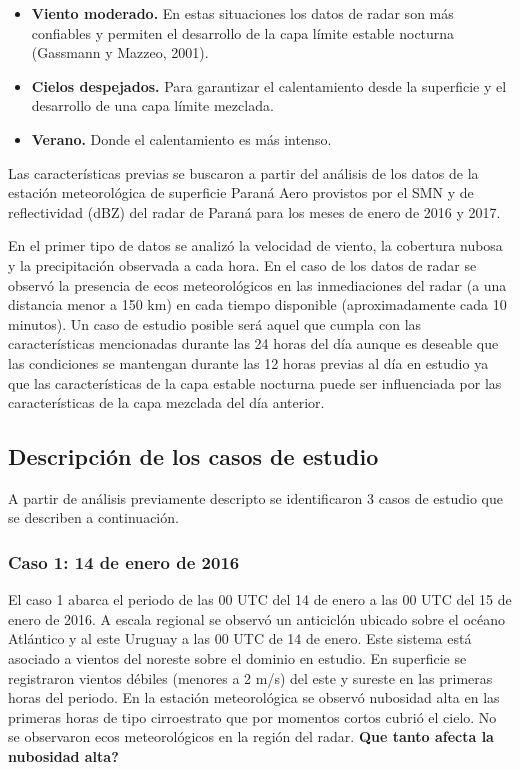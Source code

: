 \documentclass[12pt,spanish,oneside]{book}
\providecommand{\tightlist}{%
  \setlength{\itemsep}{0pt}\setlength{\parskip}{0pt}}
\begin{document}
\begin{itemize}
\tightlist
\item
  \textbf{Viento moderado.} En estas situaciones los datos de radar son
  más confiables y permiten el desarrollo de la capa límite estable
  nocturna (Gassmann y Mazzeo, 2001).
\item
  \textbf{Cielos despejados.} Para garantizar el calentamiento desde la
  superficie y el desarrollo de una capa límite mezclada.
\item
  \textbf{Verano.} Donde el calentamiento es más intenso.
\end{itemize}

Las características previas se buscaron a partir del análisis de los
datos de la estación meteorológica de superficie Paraná Aero provistos
por el SMN y de reflectividad (dBZ) del radar de Paraná para los meses
de enero de 2016 y 2017.

En el primer tipo de datos se analizó la velocidad de viento, la
cobertura nubosa y la precipitación observada a cada hora. En el caso de
los datos de radar se observó la presencia de ecos meteorológicos en las
inmediaciones del radar (a una distancia menor a 150 km) en cada tiempo
disponible (aproximadamente cada 10 minutos). Un caso de estudio posible
será aquel que cumpla con las características mencionadas durante las 24
horas del día aunque es deseable que las condiciones se mantengan
durante las 12 horas previas al día en estudio ya que las
características de la capa estable nocturna puede ser influenciada por
las características de la capa mezclada del día anterior.

\subsection{Descripción de los casos de
estudio}\label{descripcion-de-los-casos-de-estudio}

A partir de análisis previamente descripto se identificaron 3 casos de
estudio que se describen a continuación.

\subsubsection{Caso 1: 14 de enero de
2016}\label{caso-1-14-de-enero-de-2016}

El caso 1 abarca el periodo de las 00 UTC del 14 de enero a las 00 UTC
del 15 de enero de 2016. A escala regional se observó un anticiclón
ubicado sobre el océano Atlántico y al este Uruguay a las 00 UTC de 14
de enero. Este sistema está asociado a vientos del noreste sobre el
dominio en estudio. En superficie se registraron vientos débiles
(menores a 2 m/s) del este y sureste en las primeras horas del periodo.
En la estación meteorológica se observó nubosidad alta en las primeras
horas de tipo cirroestrato que por momentos cortos cubrió el cielo. No
se observaron ecos meteorológicos en la región del radar. \textbf{Que
tanto afecta la nubosidad alta?}
\end{document}
